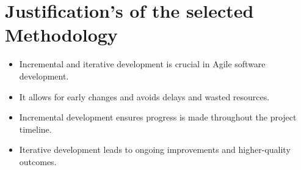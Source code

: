 \section{Justification's of the selected Methodology}
\begin{itemize}
\item Incremental and iterative development is crucial in Agile software development.
\item It allows for early changes and avoids delays and wasted resources.
\item Incremental development ensures progress is made throughout the project timeline.
\item Iterative development leads to ongoing improvements and higher-quality outcomes.
\end{itemize}